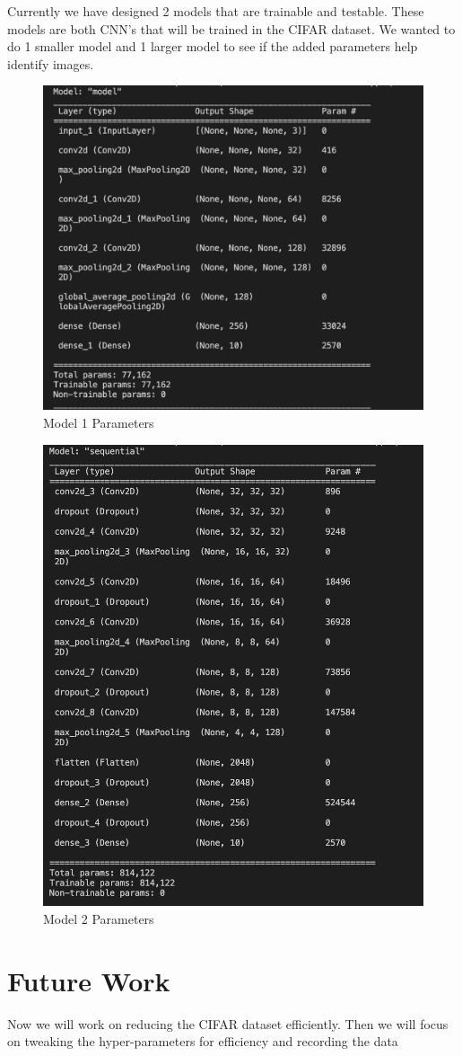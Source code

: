 \documentclass{article}
\begin{document}
Currently we have designed 2 models that are trainable and testable. These models are both CNN's that will be trained in the CIFAR dataset. We wanted to do 1 smaller model and 1 larger model to see if the added parameters help identify images.
\begin{figure}
\includegraphics[scale=.4]{model_1_params.png} 
\caption{Model 1 Parameters}
\end{figure}

\begin{figure}
\includegraphics[scale=.4]{model_2_params.png} 
\caption{Model 2 Parameters}
\end{figure}

\section{Future Work}

Now we will work on reducing the CIFAR dataset efficiently. Then we will focus on tweaking the hyper-parameters for efficiency and recording the data
\end{document}
